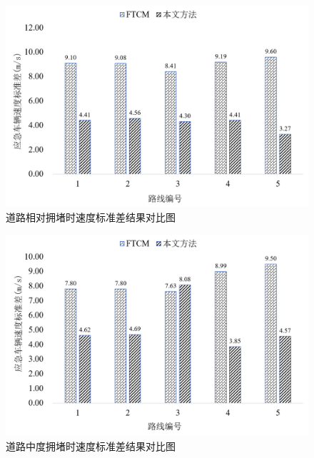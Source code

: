 \begin{figure}[H]
	\centering
	\includegraphics[width=\linewidth]{figures/std_relatively.png}
	\caption{道路相对拥堵时速度标准差结果对比图}
	\label{fig:std_relatively}
\end{figure}


\begin{figure}[H]
	\centering
	\includegraphics[width=\linewidth]{figures/std_moderate.png}
	\caption{道路中度拥堵时速度标准差结果对比图}
	\label{fig:std_moderate}
\end{figure}

